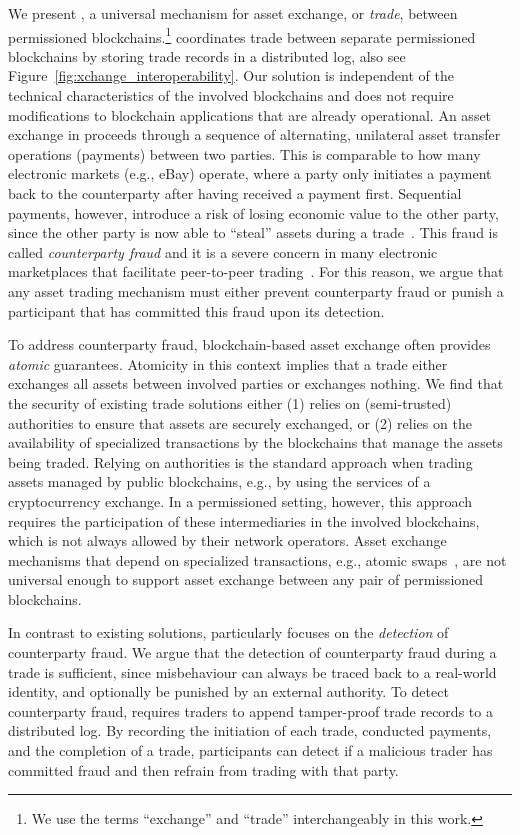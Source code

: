 We present \emph{\ModelName{}}, a universal mechanism for asset exchange, or \emph{trade}, between permissioned blockchains.\footnote{We use the terms \enquote{exchange} and \enquote{trade} interchangeably in this work.}
\ModelName{} coordinates trade between separate permissioned blockchains by storing trade records in a distributed log, also see Figure~\ref{fig:xchange_interoperability}.
Our solution is independent of the technical characteristics of the involved blockchains and does not require modifications to blockchain applications that are already operational.
An asset exchange in \ModelName{} proceeds through a sequence of alternating, unilateral asset transfer operations (payments) between two parties.
This is comparable to how many electronic markets (e.g., eBay) operate, where a party only initiates a payment back to the counterparty after having received a payment first.
Sequential payments, however, introduce a risk of losing economic value to the other party, since the other party is now able to \enquote{steal} assets during a trade~\cite{koens2019assessing}.
This fraud is called \emph{counterparty fraud} and it is a severe concern in many electronic marketplaces that facilitate peer-to-peer trading~\cite{peters2016understanding}.
For this reason, we argue that any asset trading mechanism must either prevent counterparty fraud or punish a participant that has committed this fraud upon its detection.

To address counterparty fraud, blockchain-based asset exchange often provides \emph{atomic} guarantees.
Atomicity in this context implies that a trade either exchanges all assets between involved parties or exchanges nothing.
We find that the security of existing trade solutions either (1) relies on (semi-trusted) authorities to ensure that assets are securely exchanged, or (2) relies on the availability of specialized transactions by the blockchains that manage the assets being traded.
Relying on authorities is the standard approach when trading assets managed by public blockchains, e.g., by using the services of a cryptocurrency exchange.
In a permissioned setting, however, this approach requires the participation of these intermediaries in the involved blockchains, which is not always allowed by their network operators.
Asset exchange mechanisms that depend on specialized transactions, e.g., atomic swaps~\cite{nolan2016atomic}, are not universal enough to support asset exchange between any pair of permissioned blockchains.

In contrast to existing solutions, \ModelName{} particularly focuses on the \emph{detection} of counterparty fraud.
We argue that the detection of counterparty fraud during a trade is sufficient, since misbehaviour can always be traced back to a real-world identity, and optionally be punished by an external authority.
To detect counterparty fraud, \ModelName{} requires traders to append tamper-proof trade records to a distributed log.
By recording the initiation of each trade, conducted payments, and the completion of a trade, participants can detect if a malicious trader has committed fraud and then refrain from trading with that party.

